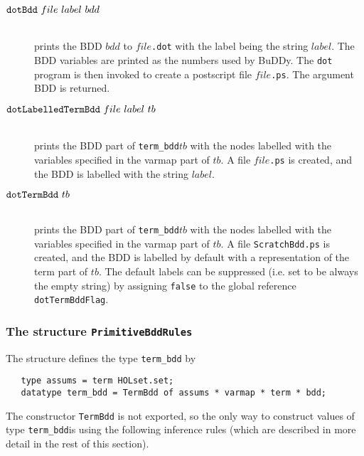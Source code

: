\documentclass[12pt]{book}
\renewcommand{\t}[1]{\mbox{\tt #1}}
\newcommand\termbddty{\texttt{term\_bdd}{}}
\newcommand{\Buddy}{BuDDy{}}
\begin{document}
\begin{description}
\item[$\t{dotBdd}~file~label~bdd$]\mbox{}\\
prints the BDD $bdd$ to $file$\t{.dot} with
the label being the string $label$. The BDD variables are printed as the numbers used by \Buddy{}.
The \t{dot} program is then invoked to create 
a postscript file $file$\t{.ps}. The argument BDD is returned.

\item[$\t{dotLabelledTermBdd}~file~label~tb$]\mbox{}\\
prints the
BDD part of \termbddty $tb$ with the nodes labelled with
the variables specified in the varmap part of $tb$. A file $file$\t{.ps}
is created, and the BDD is labelled with the string $label$.


\item[$\t{dotTermBdd}~tb$]\mbox{}\\
prints the
BDD part of \termbddty $tb$ with the nodes labelled with
the variables specified in the varmap part of $tb$. A file \t{ScratchBdd.ps}
is created, and the BDD is labelled by default with a representation
of the term part of $tb$. The default labels
can be suppressed (i.e. set to be always the empty string) by assigning \t{false}
to the global reference \t{dotTermBddFlag}.
\end{description}

\subsubsection{The structure \t{PrimitiveBddRules}}\label{PrimitiveBddRules}

The structure  defines the type \termbddty{} by

\vspace*{-2mm}

\begin{verbatim}
   type assums = term HOLset.set;
   datatype term_bdd = TermBdd of assums * varmap * term * bdd;
\end{verbatim}

\vspace*{-2mm}

The constructor \t{TermBdd} is not exported, so the only way to construct
values of type \termbddty is using the following inference rules
(which are described in more detail in the rest of this section).
\end{document}
